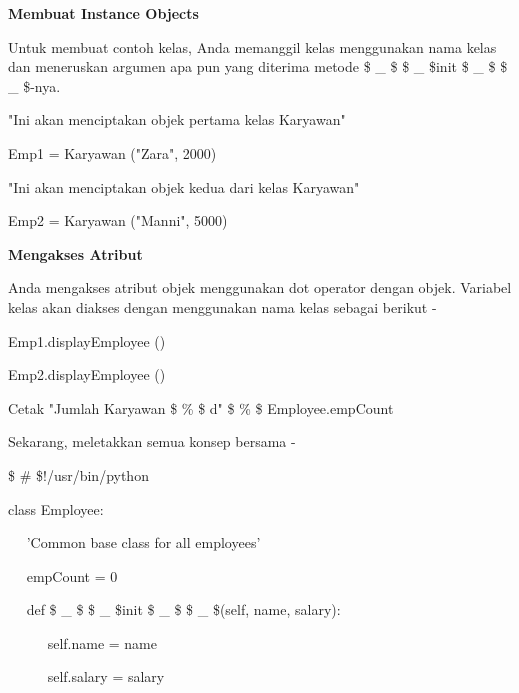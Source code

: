 \vspace{12pt}
\noindent 
{\fontsize{14pt}{14pt}\selectfont \textbf{Membuat Instance Objects} \\} \par
\vspace{12pt}
Untuk membuat contoh kelas, Anda memanggil kelas menggunakan nama kelas dan meneruskan argumen apa pun yang diterima metode  \$  \_  \$ \$  \_  \$init \$  \_  \$ \$  \_  \$-nya. \par
\vspace{12pt}
\noindent 
"Ini akan menciptakan objek pertama kelas Karyawan" \par
\noindent 
Emp1 = Karyawan ("Zara", 2000) \par
\noindent 
"Ini akan menciptakan objek kedua dari kelas Karyawan" \par
\noindent 
Emp2 = Karyawan ("Manni", 5000) \par
\vspace{12pt}
\noindent 
{\fontsize{14pt}{14pt}\selectfont \textbf{Mengakses Atribut} \\} \par
\vspace{12pt}
Anda mengakses atribut objek menggunakan dot operator dengan objek. Variabel kelas akan diakses dengan menggunakan nama kelas sebagai berikut - \par
\vspace{12pt}
\noindent 
Emp1.displayEmployee () \par
\noindent 
Emp2.displayEmployee () \par
\noindent 
Cetak "Jumlah Karyawan \$  \%  \$ d" \$  \%  \$ Employee.empCount \par
\vspace{12pt}
\noindent 
Sekarang, meletakkan semua konsep bersama - \par
\noindent 
 \$  \#  \$!/usr/bin/python \par
\vspace{12pt}
\noindent 
class Employee: \par
\noindent 
~~ 'Common base class for all employees' \par
\noindent 
~~ empCount = 0 \par
\vspace{12pt}
\noindent 
~~ def  \$  \_  \$ \$  \_  \$init \$  \_  \$ \$  \_  \$(self, name, salary): \par
\noindent 
~~~~~ self.name = name \par
\noindent 
~~~~~ self.salary = salary \par
